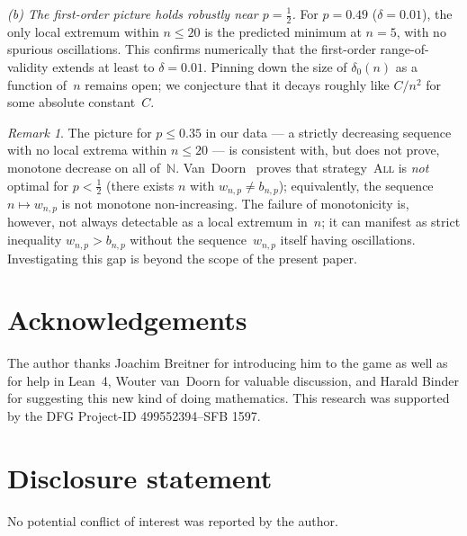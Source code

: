 \documentclass[12pt]{article}
\theoremstyle{definition}
\theoremstyle{remark}
\newtheorem{remark}[theorem]{Remark}
\newcommand{\All}{\textsc{All}}
\begin{document}
\emph{(b) The first-order picture holds robustly near $p=\tfrac12$.}
For $p=0.49$ ($\delta=0.01$), the only local extremum within
$n\le 20$ is the predicted minimum at $n=5$, with no spurious
oscillations.  This confirms numerically that the first-order
range-of-validity extends at least to $\delta=0.01$.  Pinning down
the size of $\delta_0(n)$ as a function of~$n$ remains open; we
conjecture that it decays roughly like $C/n^2$ for some absolute
constant~$C$.

\begin{remark}
  The picture for $p\le 0.35$ in our data --- a strictly
  decreasing sequence with no local extrema within $n\le 20$ ---
  is consistent with, but does not prove, monotone decrease on
  all of~$\mathbb{N}$.  Van~Doorn~\cite{vanDoorn2024} proves that
  strategy~\All{} is \emph{not} optimal for $p<\tfrac12$ (there
  exists $n$ with $w_{n,p}\ne b_{n,p}$); equivalently, the
  sequence $n\mapsto w_{n,p}$ is not monotone non-increasing.
  The failure of monotonicity is, however, not always detectable
  as a local extremum in~$n$; it can manifest as strict inequality
  $w_{n,p}>b_{n,p}$ without the sequence~$w_{n,p}$ itself having
  oscillations.  Investigating this gap is beyond the scope of the
  present paper.
\end{remark}

\section*{Acknowledgements}

The author thanks Joachim Breitner for introducing him to the
game as well as for help in Lean~4, Wouter van~Doorn for valuable discussion, 
and Harald Binder for suggesting this new kind of doing mathematics.
This research was supported by the DFG Project-ID 499552394–SFB 1597.

\section*{Disclosure statement}

No potential conflict of interest was reported by the author.

\end{document}
